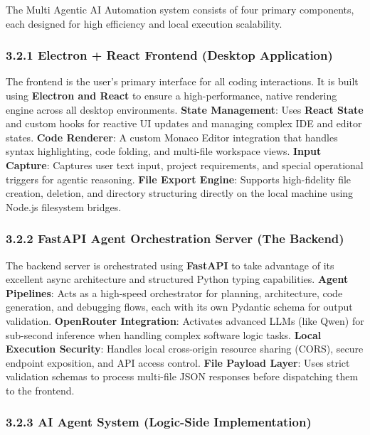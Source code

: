 \documentclass[
  12pt,
]{article}
\begin{document}
The Multi Agentic AI Automation system consists of four primary
components, each designed for high efficiency and local execution
scalability.

\subsubsection{3.2.1 Electron + React Frontend (Desktop
Application)}\label{electron-react-frontend-desktop-application}

The frontend is the user's primary interface for all coding
interactions. It is built using \textbf{Electron and React} to ensure a
high-performance, native rendering engine across all desktop
environments. \textbf{State Management}: Uses \textbf{React State} and
custom hooks for reactive UI updates and managing complex IDE and editor
states. \textbf{Code Renderer}: A custom Monaco Editor integration that
handles syntax highlighting, code folding, and multi-file workspace
views. \textbf{Input Capture}: Captures user text input, project
requirements, and special operational triggers for agentic reasoning.
\textbf{File Export Engine}: Supports high-fidelity file creation,
deletion, and directory structuring directly on the local machine using
Node.js filesystem bridges.

\subsubsection{3.2.2 FastAPI Agent Orchestration Server (The
Backend)}\label{fastapi-agent-orchestration-server-the-backend}

The backend server is orchestrated using \textbf{FastAPI} to take
advantage of its excellent async architecture and structured Python
typing capabilities. \textbf{Agent Pipelines}: Acts as a high-speed
orchestrator for planning, architecture, code generation, and debugging
flows, each with its own Pydantic schema for output validation.
\textbf{OpenRouter Integration}: Activates advanced LLMs (like Qwen) for
sub-second inference when handling complex software logic tasks.
\textbf{Local Execution Security}: Handles local cross-origin resource
sharing (CORS), secure endpoint exposition, and API access control.
\textbf{File Payload Layer}: Uses strict validation schemas to process
multi-file JSON responses before dispatching them to the frontend.

\subsubsection{3.2.3 AI Agent System (Logic-Side
Implementation)}\label{ai-agent-system-logic-side-implementation}
\end{document}
